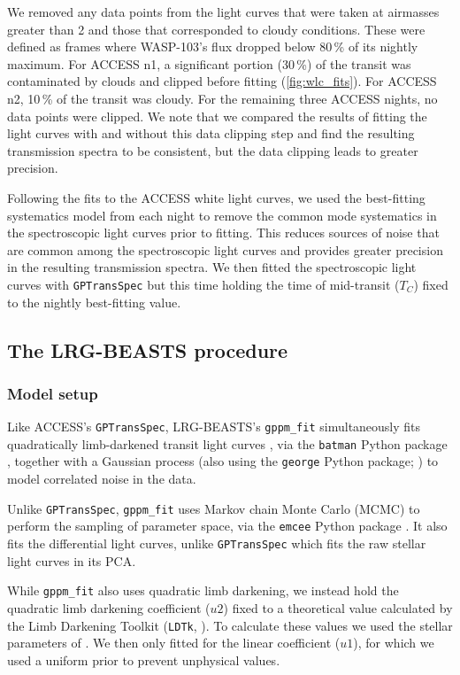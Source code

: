 \documentclass[twocolumn]{aastex63}
\newcommand{\gppmfit}{\texttt{gppm\_fit}}
\begin{document}
We removed any data points from the light curves that were taken at airmasses greater than 2 and those that corresponded to cloudy conditions. These were defined as frames where WASP-103's flux dropped below 80\,\% of its nightly maximum. For ACCESS n1, a significant portion (30\,\%) of the transit was contaminated by clouds and clipped before fitting (\autoref{fig:wlc_fits}). For ACCESS n2, 10\,\% of the transit was cloudy. For the remaining three ACCESS nights, no data points were clipped. We note that we compared the results of fitting the light curves with and without this data clipping step and find the resulting transmission spectra to be consistent, but the data clipping leads to greater precision.

Following the fits to the ACCESS white light curves, we used the best-fitting systematics model from each night to remove the common mode systematics in the spectroscopic light curves prior to fitting. This reduces sources of noise that are common among the spectroscopic light curves and provides greater precision in the resulting transmission spectra. We then fitted the spectroscopic light curves with \texttt{GPTransSpec} but this time holding the time of mid-transit ($T_C$) fixed to the nightly best-fitting value.


\subsection{The LRG-BEASTS procedure}
\label{sec:gppm_fit}

\subsubsection{Model setup}

Like ACCESS's \texttt{GPTransSpec}, LRG-BEASTS's \gppmfit{} simultaneously fits quadratically limb-darkened transit light curves \citep{Mandel2002}, via the \texttt{batman} Python package \citep{batman}, together with a Gaussian process (also using the \texttt{george} Python package; \citealt{george}) to model correlated noise in the data. 

Unlike \texttt{GPTransSpec}, \gppmfit{} uses Markov chain Monte Carlo (MCMC) to perform the sampling of parameter space, via the \texttt{emcee} Python package \citep{emcee}. It also fits the differential light curves, unlike \texttt{GPTransSpec} which fits the raw stellar light curves in its PCA.

While \gppmfit{} also uses quadratic limb darkening, we instead hold the quadratic limb darkening coefficient ($u2$) fixed to a theoretical value calculated by the Limb Darkening Toolkit (\texttt{LDTk}, \citealt{ldtk}). To calculate these values we used the stellar parameters of \cite{Delrez2018}. We then only fitted for the linear coefficient ($u1$), for which we used a uniform prior to prevent unphysical values.
\end{document}
